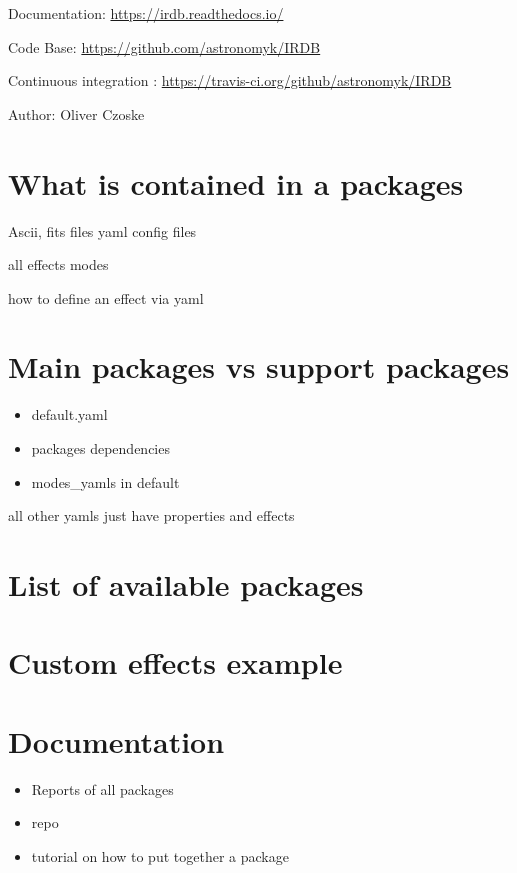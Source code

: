 
Documentation: \url{https://irdb.readthedocs.io/}

Code Base: \url{https://github.com/astronomyk/IRDB}

Continuous integration : \url{https://travis-ci.org/github/astronomyk/IRDB}

Author: Oliver Czoske


\section{What is contained in a packages%
  \label{what-is-contained-in-a-packages}%
}

Ascii, fits files
yaml config files

all effects
modes

how to define an effect via yaml


\section{Main packages vs support packages%
  \label{main-packages-vs-support-packages}%
}

\begin{itemize}
\item default.yaml

\item packages dependencies

\item modes\_yamls in default
\end{itemize}

all other yamls just have properties and effects


\section{List of available packages%
  \label{list-of-available-packages}%
}



\section{Custom effects example%
  \label{custom-effects-example}%
}



\section{Documentation%
  \label{documentation}%
}

\begin{itemize}
\item Reports of all packages

\item repo

\item tutorial on how to put together a package
\end{itemize}
